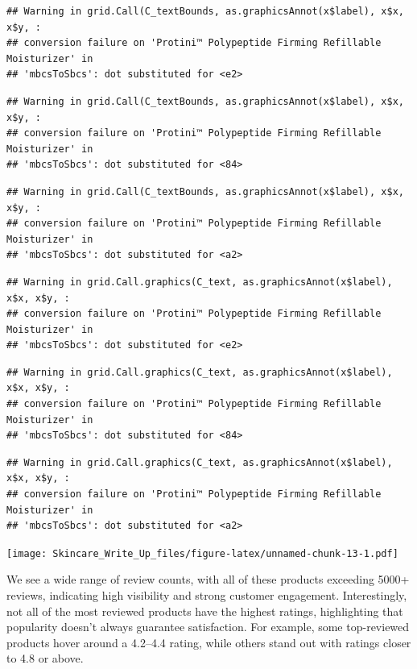 \documentclass[
]{article}
\begin{document}
\begin{verbatim}
## Warning in grid.Call(C_textBounds, as.graphicsAnnot(x$label), x$x, x$y, :
## conversion failure on 'Protini™ Polypeptide Firming Refillable Moisturizer' in
## 'mbcsToSbcs': dot substituted for <e2>
\end{verbatim}

\begin{verbatim}
## Warning in grid.Call(C_textBounds, as.graphicsAnnot(x$label), x$x, x$y, :
## conversion failure on 'Protini™ Polypeptide Firming Refillable Moisturizer' in
## 'mbcsToSbcs': dot substituted for <84>
\end{verbatim}

\begin{verbatim}
## Warning in grid.Call(C_textBounds, as.graphicsAnnot(x$label), x$x, x$y, :
## conversion failure on 'Protini™ Polypeptide Firming Refillable Moisturizer' in
## 'mbcsToSbcs': dot substituted for <a2>
\end{verbatim}

\begin{verbatim}
## Warning in grid.Call.graphics(C_text, as.graphicsAnnot(x$label), x$x, x$y, :
## conversion failure on 'Protini™ Polypeptide Firming Refillable Moisturizer' in
## 'mbcsToSbcs': dot substituted for <e2>
\end{verbatim}

\begin{verbatim}
## Warning in grid.Call.graphics(C_text, as.graphicsAnnot(x$label), x$x, x$y, :
## conversion failure on 'Protini™ Polypeptide Firming Refillable Moisturizer' in
## 'mbcsToSbcs': dot substituted for <84>
\end{verbatim}

\begin{verbatim}
## Warning in grid.Call.graphics(C_text, as.graphicsAnnot(x$label), x$x, x$y, :
## conversion failure on 'Protini™ Polypeptide Firming Refillable Moisturizer' in
## 'mbcsToSbcs': dot substituted for <a2>
\end{verbatim}

\texttt{[image: Skincare\_Write\_Up\_files/figure-latex/unnamed-chunk-13-1.pdf]}

We see a wide range of review counts, with all of these products
exceeding 5000+ reviews, indicating high visibility and strong customer
engagement. Interestingly, not all of the most reviewed products have
the highest ratings, highlighting that popularity doesn't always
guarantee satisfaction. For example, some top-reviewed products hover
around a 4.2--4.4 rating, while others stand out with ratings closer to
4.8 or above.
\end{document}
